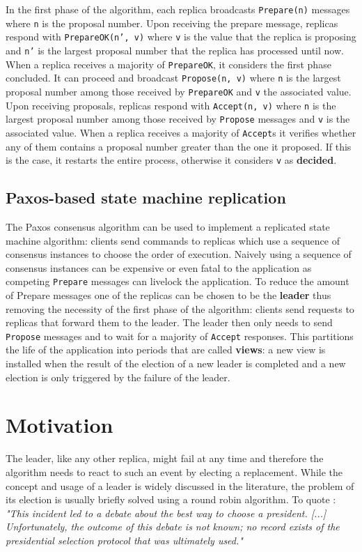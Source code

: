 \documentclass[a4paper, 10pt]{article}
\begin{document}
In the first phase of the algorithm, each replica broadcasts \texttt{Prepare(n)} messages where \texttt{n} is the proposal number. Upon receiving the prepare message, replicas respond with \texttt{PrepareOK(n', v)}  where \texttt{v} is the value that the replica is proposing and \texttt{n'} is the largest proposal number that the replica has processed until now. When a replica receives a majority of \texttt{PrepareOK}, it considers the first phase concluded. It can proceed and broadcast \texttt{Propose(n, v)} where \texttt{n} is the largest proposal number among those received by \texttt{PrepareOK} and \texttt{v} the associated value.
Upon receiving proposals, replicas respond with \texttt{Accept(n, v)}  where \texttt{n} is the largest proposal number among those received by \texttt{Propose} messages and \texttt{v} is the associated value. When a replica receives a majority of \texttt{Accept}s it verifies whether any of them contains a proposal number greater than the one it proposed. If this is the case, it restarts the entire process, otherwise it considers \texttt{v} as \textbf{decided}.

\subsection{Paxos-based state machine replication}
The Paxos consensus algorithm can be used to implement a replicated state machine algorithm: clients send commands to replicas which use a sequence of consensus instances to choose the order of execution.
Naively using a sequence of consensus instances can be expensive or even fatal to the application as competing \texttt{Prepare} messages can livelock the application.
To reduce the amount of Prepare messages one of the replicas can be chosen to be the \textbf{leader} thus removing the necessity of the first phase of the algorithm: clients send requests to replicas that forward them to the leader. The leader then only needs to send \texttt{Propose} messages and to wait for a majority of \texttt{Accept} responses. This partitions the life of the application into periods that are called \textbf{views}: a new view is installed when the result of the election of a new leader is completed and a new election is only triggered by the failure of the leader.

\section{Motivation}
The leader, like any other replica, might fail at any time and therefore the algorithm needs to react to such an event by electing a replacement. While the concept and usage of a leader is widely discussed in the literature\cite{raft}, the problem of its election is usually briefly solved using a round robin algorithm. To quote \cite{parttimeLamp}: \textit{"This incident led to a debate about the best way to choose a president. [...] Unfortunately, the outcome of this debate is not known; no record exists of the presidential selection protocol that was ultimately used."}
\end{document}
